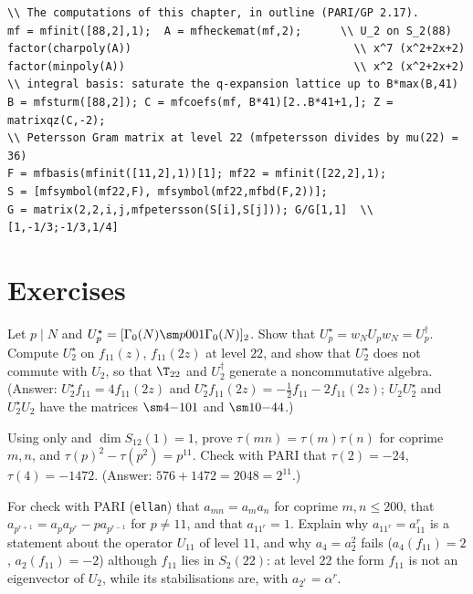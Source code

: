 \begin{lstlisting}[language=GP]
\\ The computations of this chapter, in outline (PARI/GP 2.17).
mf = mfinit([88,2],1);  A = mfheckemat(mf,2);      \\ U_2 on S_2(88)
factor(charpoly(A))                                  \\ x^7 (x^2+2x+2)
factor(minpoly(A))                                   \\ x^2 (x^2+2x+2)
\\ integral basis: saturate the q-expansion lattice up to B*max(B,41)
B = mfsturm([88,2]); C = mfcoefs(mf, B*41)[2..B*41+1,]; Z = matrixqz(C,-2);
\\ Petersson Gram matrix at level 22 (mfpetersson divides by mu(22) = 36)
F = mfbasis(mfinit([11,2],1))[1]; mf22 = mfinit([22,2],1);
S = [mfsymbol(mf22,F), mfsymbol(mf22,mfbd(F,2))];
G = matrix(2,2,i,j,mfpetersson(S[i],S[j])); G/G[1,1]  \\ [1,-1/3;-1/3,1/4]
\end{lstlisting}

\section{Exercises}\label{sec:hecke:exercises}

\begin{exercise}\label{ex:hecke:ex-cosets}
Let $p\mid N$ and $U_p^\star=[\Gamma_0(N)\sm p001\Gamma_0(N)]_2$. Show that $U_p^\star=w_NU_pw_N=U_p^\dagger$. Compute $U_2^\star$ on $f_{11}(z)$, $f_{11}(2z)$ at level $22$, and show that $U_2^\star$ does not commute with
$U_2$, so that $\T_{22}$ and $U_2^\dagger$ generate a noncommutative algebra. (Answer: $U_2^\star f_{11}=4f_{11}(2z)$ and $U_2^\star f_{11}(2z)=-\frac12f_{11}-2f_{11}(2z)$; $U_2U_2^\star$ and $U_2^\star U_2$ have the
matrices $\sm4{-1}01$ and $\sm10{-4}4$.)
\end{exercise}

\begin{exercise}\label{ex:hecke:ex-tau}
Using only  and $\dim S_{12}(1)=1$, prove $\tau(mn)=\tau(m)\tau(n)$ for coprime $m,n$, and $\tau(p)^2-\tau(p^2)=p^{11}$. Check with PARI that $\tau(2)=-24$, $\tau(4)=-1472$.
(Answer: $576+1472=2048=2^{11}$.)
\end{exercise}

\begin{exercise}\label{ex:hecke:ex-a11}
For  check with PARI (\texttt{ellan}) that $a_{mn}=a_ma_n$ for coprime $m,n\le200$, that $a_{p^{r+1}}=a_pa_{p^r}-pa_{p^{r-1}}$ for $p\ne11$, and that $a_{11^r}=1$. Explain why $a_{11^r}=a_{11}^r$ is a
statement about the operator $U_{11}$ of level $11$, and why $a_4=a_2^2$ fails ($a_4(f_{11})=2$, $a_2(f_{11})=-2$) although $f_{11}$ lies in $S_2(22)$: at level $22$ the form $f_{11}$ is not an eigenvector
of $U_2$, while its stabilisations are, with $a_{2^r}=\alpha^r$.
\end{exercise}

